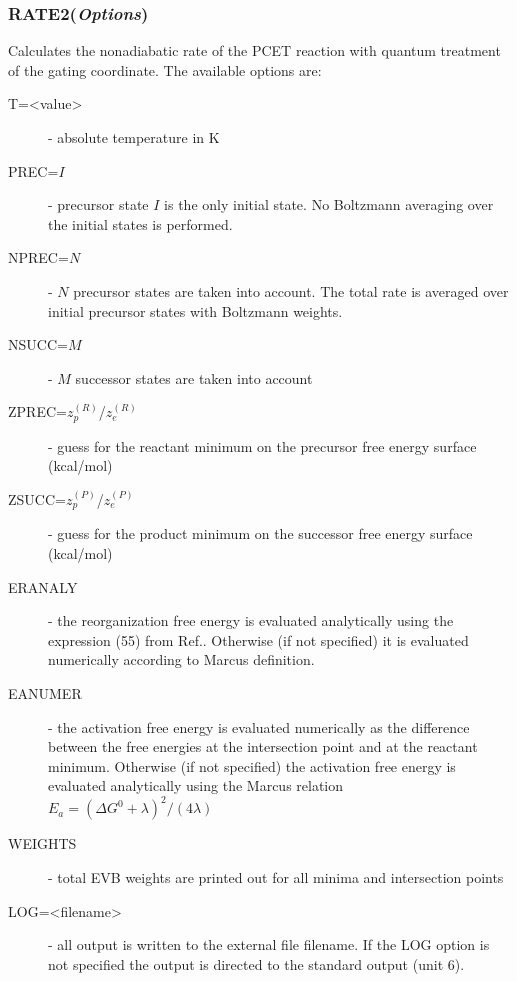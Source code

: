 \documentclass[oneside,11pt,openany]{book}
\newcommand{\tw}{\ttfamily}
\begin{document}
\subsubsection*{RATE2({\it Options})}
%
Calculates the nonadiabatic rate of the PCET reaction
with quantum treatment of the gating coordinate.
The available options are:
%
\begin{description}
%
\item[{\tw T=<value>}] - absolute temperature in K

\item[{\tw PREC=$I$}] - precursor state $I$ is the only initial state.
	 No Boltzmann averaging over the initial states
	 is performed.

\item[{\tw NPREC=$N$}] - $N$ precursor states are taken into account.
	  The total rate is averaged over initial
	  precursor states with Boltzmann weights.

\item[{\tw NSUCC=$M$}] - $M$ successor states are taken into account

\item[{\tw ZPREC=$z_p^{(R)}$/$z_e^{(R)}$}] - guess for the reactant minimum
             on the precursor free energy surface (kcal/mol)

\item[{\tw ZSUCC=$z_p^{(P)}$/$z_e^{(P)}$}] - guess for the product minimum
             on the successor free energy surface (kcal/mol)

\item[{\tw ERANALY}] - the reorganization free energy is evaluated analytically
	  using the expression (55) from Ref.\cite{pcet-jcp2}.
	  Otherwise (if not specified) it is evaluated
	  numerically according to Marcus definition.

\item[{\tw EANUMER}] - the activation free energy is evaluated numerically
	  as the difference between the free energies at the
	  intersection point and at the reactant minimum.
	  Otherwise (if not specified) the activation free
	  energy is evaluated analytically using the Marcus
	  relation $E_a=(\Delta G^0+\lambda)^2/(4\lambda)$

\item[{\tw WEIGHTS}] - total EVB weights are printed out for all minima
	  and intersection points

\item[{\tw LOG=<filename>}] - all output is written to the external file
		 {\tw filename}. If the {\tw LOG} option is not specified
		 the output is directed to the standard output
		 (unit 6).


\end{description}
\end{document}
